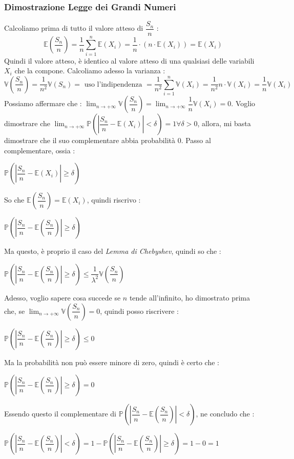 \documentclass[12pt, letterpaper]{article}
\newcommand{\E}{{\mathbb E}}
\newcommand{\V}{{\mathbb V}}
\newcommand{\Prob}{{\mathbb P}}
\begin{document}
\subsubsection{Dimostrazione Legge dei Grandi Numeri}
Calcoliamo prima di tutto il valore atteso di \(\dfrac{S_n}{n}\) : \begin{equation}
    \E(\dfrac{S_n}{n})=\dfrac{1}{n}\sum_{i=1}^n\E(X_i)=\dfrac{1}{n}\cdot(n\cdot\E(X_i))=\E(X_i)
\end{equation}
Quindi il valore atteso, è identico al valore atteso di una qualsiasi delle variabili \(X_i\) che la compone.
Calcoliamo adesso la varianza : 
\begin{equation}
    \V(\dfrac{S_n}{n})=\dfrac{1}{n^2}\V(S_n)=\text{ uso l'indipendenza }=\dfrac{1}{n^2}\sum_{i=1}^n\V(X_i)
    =\dfrac{1}{n^2}n\cdot\V(X_i)=\dfrac{1}{n}\V(X_i)
\end{equation}
Possiamo affermare che : \(\displaystyle\lim_{n\rightarrow +\infty}\V(\dfrac{S_n}{n})=
\displaystyle\lim_{n\rightarrow +\infty}\dfrac{1}{n}\V(X_i)=0\).
Voglio dimostrare che  \(\displaystyle\lim_{n\rightarrow +\infty}\Prob(|\dfrac{S_n}{n}-\E(X_i)|<\delta)=1\)\hphantom{aa}\(\forall \delta>0\), 
allora, mi basta dimostrare che il suo complementare abbia probabilità 0. Passo al complementare, ossia : \begin{center}
    \(\Prob(|\dfrac{S_n}{n}-\E(X_i)|\ge\delta)\)
\end{center}
So che \(\E(\dfrac{S_n}{n})=\E(X_i)\), quindi riscrivo :
\begin{center}
    \(\Prob(|\dfrac{S_n}{n}-\E(\dfrac{S_n}{n})|\ge\delta)\)
\end{center}
Ma questo, è proprio il caso del \textit{Lemma di Chebyshev}, quindi so che : 
\begin{center}
    \(\Prob(|\dfrac{S_n}{n}-\E(\dfrac{S_n}{n})|\ge\delta)\le \dfrac{1}{\lambda^2}\V(\dfrac{S_n}{n})\)
\end{center}
Adesso, voglio sapere cosa succede se \(n\) tende all'infinito, ho dimostrato prima che, 
se \(\displaystyle\lim_{n\rightarrow +\infty}\V(\dfrac{S_n}{n})=0\), quindi posso riscrivere  :
\begin{center}
    \(\Prob(|\dfrac{S_n}{n}-\E(\dfrac{S_n}{n})|\ge\delta)\le 0\)
\end{center}
Ma la probabilità non può essere minore di zero, quindi è certo che : 
\begin{center}
    \(\Prob(|\dfrac{S_n}{n}-\E(\dfrac{S_n}{n})|\ge\delta)= 0\)
\end{center}
Essendo questo il complementare di  \(\Prob(|\dfrac{S_n}{n}-\E(\dfrac{S_n}{n})|<\delta)\), ne concludo che : \begin{center}
    \(\Prob(|\dfrac{S_n}{n}-\E(\dfrac{S_n}{n})|<\delta)= 1-\Prob(|\dfrac{S_n}{n}-\E(\dfrac{S_n}{n})|\ge\delta)=1-0=1\)
\end{center}
\end{document}
